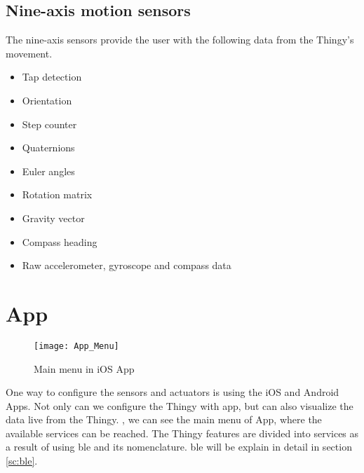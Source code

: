 \subsection{Nine-axis motion sensors}\label{sc:features_mot}
The nine-axis sensors provide the user with the following data from the Thingy's movement.
\begin{itemize}
	\item Tap detection
	\item Orientation
	\item Step counter
	\item Quaternions
	\item Euler angles
	\item Rotation matrix
	\item Gravity vector
	\item Compass heading
	\item Raw accelerometer, gyroscope and compass data
\end{itemize}

\section{App}
\begin{figure}[hbt!]
	\centering
	\texttt{[image: App\_Menu]}
	\caption{Main menu in iOS App}
	\label{fig:app_menu}
\end{figure}
One way to configure the sensors and actuators is using the iOS and Android Apps. Not only can we configure the Thingy with app, but can also visualize the data live from the Thingy. , we can see the main menu of App, where the available services can be reached. The Thingy features are divided into services as a result of using \gls{ble} and its nomenclature. \gls{ble} will be explain in detail in section \ref{sc:ble}.


